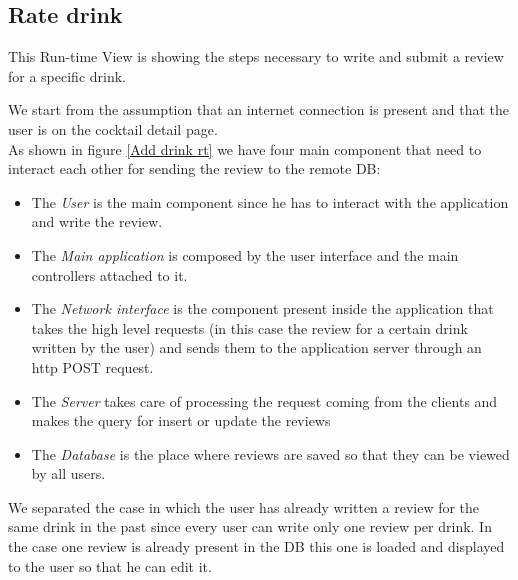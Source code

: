 \documentclass[paper=a4, fontsize=12pt]{scrartcl}
\numberwithin{equation}{section}		%
\numberwithin{figure}{section}			%
\numberwithin{table}{section}				%
\begin{document}
\subsection{Rate drink}\label{section : Rate drink}
This Run-time View is showing the steps necessary to write and submit a review for a specific drink.

We start from the assumption that an internet connection is present and that the user is on the cocktail detail page.\\
As shown in figure \ref{Add drink rt} we have four main component that need to interact each other for sending the review to the remote DB:
\begin{itemize}
    \item The \textit{User} is the main component since he has to interact with the application and write the review.
    \item The \textit{Main application} is composed by the user interface and the main controllers attached to it.
    \item The \textit{Network interface} is the component present inside the application that takes the high level requests (in this case the review for a certain drink written by the user) and sends them to the application server through an http POST request.
    \item The \textit{Server} takes care of processing the request coming from the clients and makes the query for insert or update the reviews
    \item The \textit{Database} is the place where reviews are saved so that they can be viewed by all users.
\end{itemize}
We separated the case in which the user has already written a review for the same drink in the past since every user can write only one review per drink. In the case one review is already present in the DB this one is loaded and displayed to the user so that he can edit it.
\end{document}
